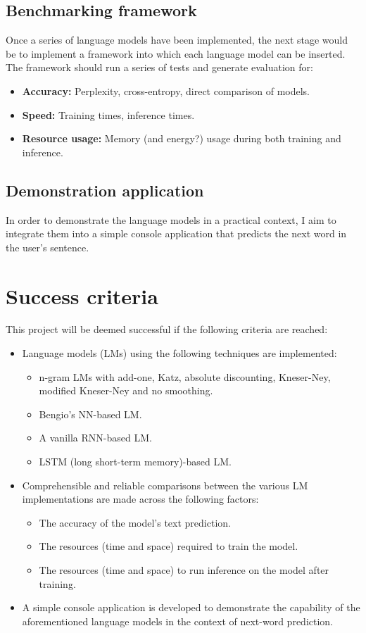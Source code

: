 \documentclass[a4paper, 12pt]{article}
\newcommand{\tbf}[1]{\textbf{#1}}
\begin{document}
\subsection*{Benchmarking framework}
Once a series of language models have been implemented, the next stage would be to implement a framework into which each language model can be inserted. The framework should run a series of tests and generate evaluation for:
\begin{itemize}
\item
	\tbf{Accuracy:} Perplexity, cross-entropy, direct comparison of models.
\item
	\tbf{Speed:} Training times, inference times.
\item
	\tbf{Resource usage:} Memory (and energy?) usage during both training and inference.
\end{itemize}

\subsection*{Demonstration application}
In order to demonstrate the language models in a practical context, I aim to integrate them into a simple console application that predicts the next word in the user's sentence.

\section*{Success criteria}

This project will be deemed successful if the following criteria are reached:

\begin{itemize}
\item
	Language models (LMs) using the following techniques are implemented:
	\begin{itemize}
	\item
		n-gram LMs with add-one, Katz, absolute discounting, Kneser-Ney, modified Kneser-Ney and no smoothing.
	\item
		Bengio's NN-based LM.
	\item
		A vanilla RNN-based LM.
	\item
		LSTM (long short-term memory)-based LM.
	\end{itemize}
\item
	Comprehensible and reliable comparisons between the various LM implementations are made across the following factors:
	\begin{itemize}
	\item
		The accuracy of the model's text prediction.
	\item
		The resources (time and space) required to train the model.
	\item
		The resources (time and space) to run inference on the model after training.
	\end{itemize}
\item
	A simple console application is developed to demonstrate the capability of the aforementioned language models in the context of next-word prediction.
\end{itemize}
\end{document}
